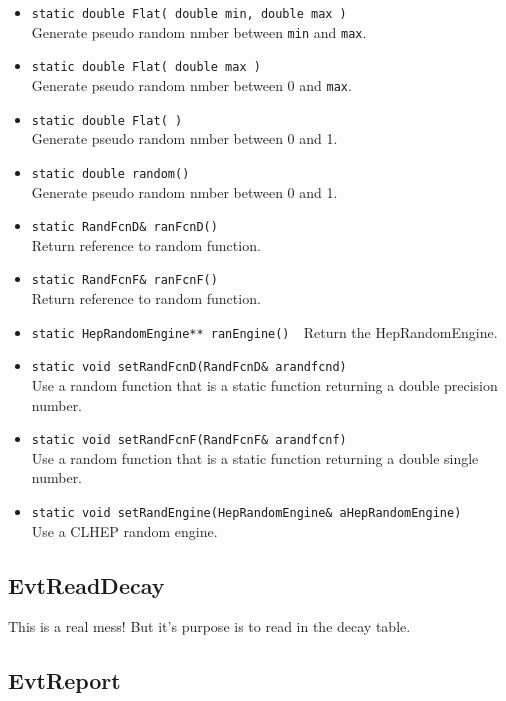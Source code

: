 \begin{itemize}
\item {\tt static double Flat( double min, double max ) }\\
      Generate pseudo random nmber between {\tt min} and {\tt max}.
\item {\tt static double Flat( double max ) }\\
      Generate pseudo random nmber between 0 and {\tt max}.
\item {\tt static double Flat( ) }\\
      Generate pseudo random nmber between 0 and 1.
\item {\tt static double random() }\\
      Generate pseudo random nmber between 0 and 1.
\item {\tt static RandFcnD\& ranFcnD() }\\
      Return reference to random function.
\item {\tt static RandFcnF\& ranFcnF() }\\
      Return reference to random function.
\item {\tt static HepRandomEngine** ranEngine() }\
      Return the HepRandomEngine.
\item {\tt static void setRandFcnD(RandFcnD\& arandfcnd) }\\
      Use a random function that is a static function returning
      a double precision number.
\item {\tt static void setRandFcnF(RandFcnF\& arandfcnf) }\\
      Use a random function that is a static function returning
      a double single number.
\item {\tt static void setRandEngine(HepRandomEngine\& aHepRandomEngine) }\\
      Use a CLHEP random engine.
\end{itemize}

\subsection{EvtReadDecay}

This is a real mess! But it's purpose is to read in the decay
table. 

\subsection{EvtReport}

